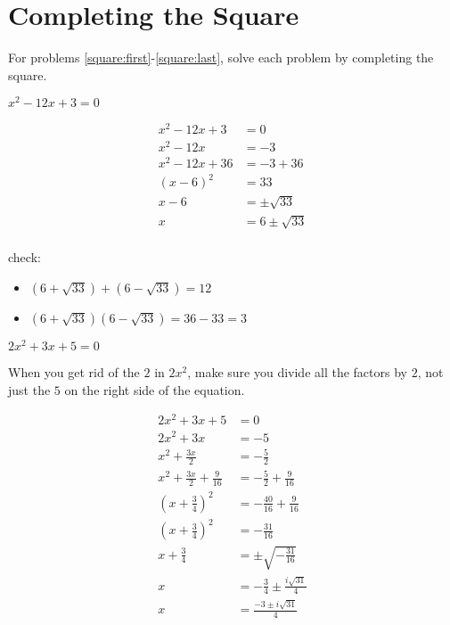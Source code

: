 \documentclass[fleqn,addpoints]{exam}
\begin{document}
\begin{questions}
\begin{solution}[5 cm]
\end{solution}

\section{Completing the Square}
For problems \ref{square:first}-\ref{square:last}, solve each problem by completing the square.

\question[10] \( x^2 - 12x + 3 = 0 \)
\label{square:first}
\begin{solution}[6 cm]
\begin{align*}
  x^2 - 12x + 3 &= 0 \\
  x^2 - 12x &= -3 \\
  x^2 - 12x + 36 &= -3 + 36 \\
  (x-6)^2 &= 33 \\
  x-6 &= \pm \sqrt{33} \\
  x &= 6 \pm \sqrt{33} \\
\end{align*}

check:
\begin{itemize}
  \item \( (6 + \sqrt{33}) + (6 - \sqrt{33}) = 12 \)
  \item \( (6 + \sqrt{33})(6 - \sqrt{33}) = 36 - 33 = 3 \)
\end{itemize}

\end{solution}

\question[10] \( 2x^2 + 3x + 5 = 0 \)
\label{square:last}
\begin{solution}[6 cm]
When you get rid of the $2$ in $2x^2$, make sure you divide all the factors by $2$, not just the
$5$ on the right side of the equation.

\begin{align*}
  2x^2 + 3x + 5 &= 0 \\
  2x^2 + 3x &= -5 \\
  x^2 + \frac{3x}{2}  &= - \frac{5}{2} \\
  x^2 + \frac{3x}{2} + \frac{9}{16} &= - \frac{5}{2} + \frac{9}{16} \\
  \left(x + \frac{3}{4} \right)^2 &= - \frac{40}{16} + \frac{9}{16} \\
  \left(x + \frac{3}{4} \right)^2 &= - \frac{31}{16} \\
  x + \frac{3}{4} &= \pm \sqrt{-\frac{31}{16}} \\
  x  &= -\frac{3}{4} \pm \frac{i \sqrt{31}}{4} \\
  x &= \frac{-3 \pm i \sqrt{31}}{4} \\
\end{align*}
\end{solution}


\end{questions}
\end{document}
